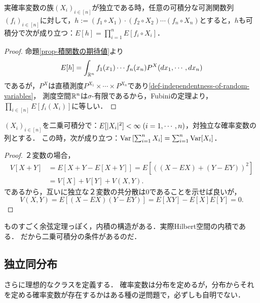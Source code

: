 \documentclass[uplatex,dvipdfmx]{jsreport}
\begin{document}
\begin{corollary}[期待値が積を保つ条件]\label{cor-mean-of-product-of-independent-variables}
    実確率変数の族$(X_i)_{i\in[n]}$が独立である時，任意の可積分な可測関数列$(f_i)_{i\in[n]}$に対して，$h:=(f_1\circ X_1)\cdot(f_2\circ X_2)\cdots(f_n\circ X_n)$とすると，$h$も可積分で次が成り立つ：$E[h]=\prod_{i=1}^nE[f_i\circ X_i]$．
\end{corollary}
\begin{proof}
    命題\ref{prop-積関数の期待値}より
    \[E[h]=\int_{\mathbb{R}^n}f_1(x_1)\cdots f_n(x_n)P^X(dx_1,\cdots,dx_n)\]
    であるが，$P^X$は直積測度$P^{X_1}\times\cdots\times P^{X_n}$であり\ref{def-independentness-of-random-variables}，
    測度空間$\mathbb{R}^n$は$\sigma$-有限であるから，Fubiniの定理より，$\prod_{i\in[n]}E[f_i(X_i)]$に等しい．
\end{proof}

\begin{corollary}[分散が和を保つ条件]\label{cor-linearity-of-Var-on-independent-variables}
    $(X_i)_{i\in[n]}$を二乗可積分で：$E[\lvert X_i\rvert^2]<\infty\;(i=1,\cdots,n)$，対独立な確率変数の列とする．
    この時，次が成り立つ：$\mathrm{Var}\left[\sum^n_{i=1}X_i\right]=\sum^n_{i=1}\mathrm{Var}[X_i]$．
\end{corollary}
\begin{proof}
    ２変数の場合，
    \begin{align*}
        V[X+Y]&=E[X+Y-E[X+Y]]=E[((X-EX)+(Y-EY))^2]\\
        &=V[X]+V[Y]+V(X,Y).
    \end{align*}
    であるから，互いに独立な２変数の共分散は$0$であることを示せば良いが，
    \[V(X,Y)=E[(X-EX)(Y-EY)]=E[XY]-E[X]E[Y]=0.\]
\end{proof}
\begin{remarks}
    ものすごく余弦定理っぽく，内積の構造がある．実際Hilbert空間の内積である．
    だから二乗可積分の条件があるのだ．
\end{remarks}

\subsection{独立同分布}

\begin{tcolorbox}[colframe=ForestGreen, colback=ForestGreen!10!white,breakable,colbacktitle=ForestGreen!40!white,coltitle=black,fonttitle=\bfseries\sffamily,
title=]
    さらに理想的なクラスを定義する．
    確率変数は分布を定めるが，分布からそれを定める確率変数が存在するかはある種の逆問題で，必ずしも自明でない．
\end{tcolorbox}
\end{document}

